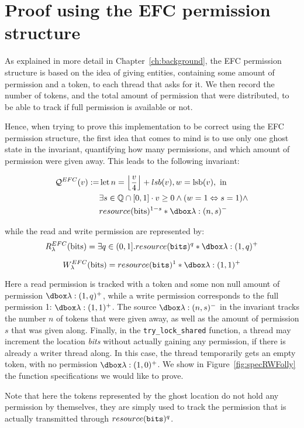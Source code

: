\section{Proof using the EFC permission structure}
As explained in more detail in Chapter~\ref{ch:background}, the EFC permission structure is based on the idea of giving entities, containing some amount of permission and a token, to each thread that asks for it. We then record the number of tokens, and the total amount of permission that were distributed, to be able to track if full permission is available or not. 

Hence, when trying to prove this implementation to be correct using the EFC permission structure, the first idea that comes to mind is to use only one ghost state in the invariant, quantifying how many permissions, and which amount of permission were given away. This leads to the following invariant:

$$\begin{aligned} \mathcal{Q}^{EFC}(v) :=& \operatorname{let} n=\left\lfloor\frac{v}{4}\right\rfloor + lsb(v), w=\operatorname{lsb}(v), \text { in } \\ & \exists s \in \mathbb{Q} \cap[0,1] \cdot v \geq 0 \wedge (w=1 \Leftrightarrow s=1) \wedge \\ & resource(\mathrm{bits})^{1-s} * \ghost{\lambda :(n, s)^{-}}
\end{aligned} $$

while the read and write permission are represented by:
$$\rPerm = \exists q \in (0, 1].\ress{q}* \ghost{\lambda : (1, q)^+}$$

$$\wPerm = \ress{1} * \ghost{\lambda:(1, 1)^+}$$

Here a read permission is tracked with a token and some non null amount of permission $\ghost{\lambda :(1, q)^+}$, while a write permission corresponds to the full permission 1: $\ghost{\lambda:(1, 1)^+}$. The source $\ghost{\lambda :(n, s)^{-}}$ in the invariant tracks the number $n$ of tokens that were given away, as well as the amount of permission $s$ that was given along. Finally, in the \texttt{try\_lock\_shared} function, a thread may increment the location \emph{bits} without actually gaining any permission, if there is already a writer thread along. In this case, the thread temporarily gets an empty token, with no permission $\ghost{\lambda:(1, 0)^+}$.  We show in Figure~\ref{fig:specRWFolly} the function specifications we would like to prove. 

Note that here the tokens represented by the ghost location do not hold any permission by themselves, they are simply used to track the permission that is actually transmitted through $resource(\texttt{bits})^{q}$.

